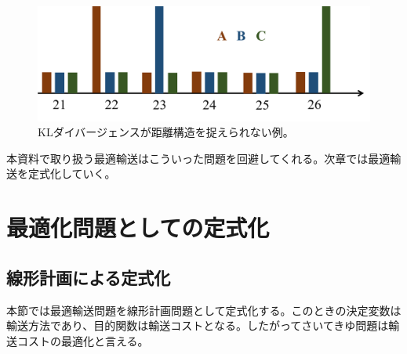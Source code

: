 \documentclass[dvipdfmx, 9pt, a4paper]{jsarticle}
\begin{document}
\begin{figure}[b]
\begin{center}
\includegraphics[width=12cm]{fig2.png}
\caption{KLダイバージェンスが距離構造を捉えられない例。}
\end{center}
\end{figure}

本資料で取り扱う最適輸送はこういった問題を回避してくれる。次章では最適輸送を定式化していく。

\section{最適化問題としての定式化}
\subsection{線形計画による定式化}
本節では最適輸送問題を線形計画問題として定式化する。このときの決定変数は輸送方法であり、目的関数は輸送コストとなる。したがってさいてきゆ問題は輸送コストの最適化と言える。
\end{document}
